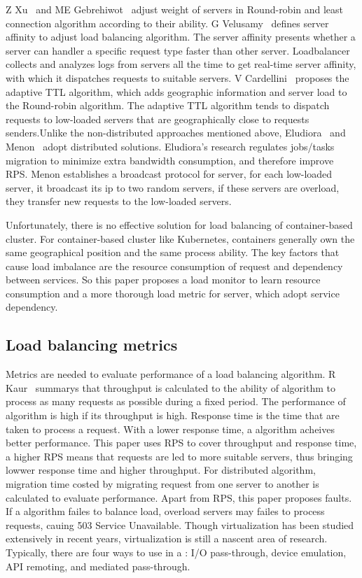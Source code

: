 Z Xu~{\cite{Xu2014A}} and ME Gebrehiwot~{\cite{Gebrehiwot2017Energy}} adjust weight of servers in Round-robin and least connection algorithm according to their ability. G Velusamy~{\cite{Velusamy2017Smart}} defines server affinity to adjust load balancing algorithm. The server affinity presents whether a server can handler a specific request type faster than
other server. Loadbalancer collects and analyzes logs from servers all the time to get real-time server affinity, with which it dispatches requests to suitable servers. V Cardellini~{\cite{Cardellini2015Dynamic}} proposes the adaptive TTL algorithm, which adds geographic information and server load to the Round-robin algorithm. The adaptive TTL algorithm
tends to dispatch requests to low-loaded servers that are geographically close to requests senders.Unlike the non-distributed approaches mentioned above, Eludiora~{\cite{Eludiora2010A}} and Menon~{\cite{Menon2013A}} adopt distributed solutions. Eludiora's research regulates jobs/tasks migration to minimize extra bandwidth consumption, and therefore improve RPS.
Menon establishes a broadcast protocol for server, for each low-loaded server, it broadcast its ip to two random servers, if these servers are overload, they transfer new requests to the low-loaded servers.

Unfortunately, there is no effective solution for load balancing of container-based cluster. For container-based cluster like Kubernetes, containers generally own the same geographical position and the same process ability. The key factors that cause load imbalance are the resource consumption of request and dependency between services. So this paper proposes
a load monitor to learn resource consumption and a more thorough load metric for server, which adopt service dependency.
\subsection{Load balancing metrics}

Metrics are needed to evaluate performance of a load balancing algorithm. R Kaur~{\cite{Kaur2014Load}} summarys that throughput is calculated to the ability of algorithm to process as many requests as possible during a fixed period. The performance of algorithm is high if its throughput is high. Response time is the time that are taken to process a request.
With a lower response time, a algorithm acheives better performance. This paper uses RPS to cover throughput and response time, a higher RPS means that requests are led to more suitable servers, thus bringing lowwer response time and higher throughput. For distributed algorithm, migration time costed by migrating request from one server to another is calculated
to evaluate performance. Apart from RPS, this paper proposes faults. If a algorithm failes to balance load, overload servers may failes to process requests, cauing 503 Service Unavailable.  Though virtualization has been studied extensively in recent years, \gpu{} virtualization is still a nascent area of research. Typically, there are four ways to use \gpu{} in a \vm{}: I/O pass-through, device emulation, API remoting, and mediated pass-through.


